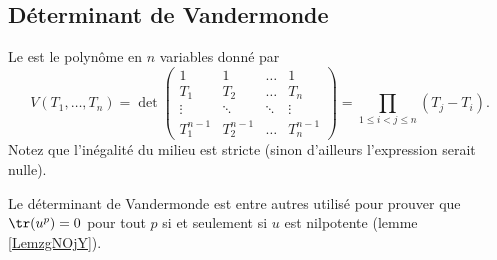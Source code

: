 \subsection{Déterminant de Vandermonde}

\begin{proposition}  \label{PropnuUvtj}
    Le  est le polynôme en \( n\) variables donné par
    \begin{equation}
        V(T_1,\ldots, T_n)=\det\begin{pmatrix}
             1   &   1    &   \ldots    &   1    \\
             T_1   &   T_2    &   \ldots    &   T_n    \\
             \vdots   &   \ddots    &   \ddots    &   \vdots    \\ 
             T_1^{n-1}   &   T_2^{n-1}    &   \ldots    &   T_n^{n-1}     
         \end{pmatrix}=\prod_{1\leq i<j\leq n}(T_j-T_i).
    \end{equation}
    Notez que l'inégalité du milieu est stricte (sinon d'ailleurs l'expression serait nulle).
\end{proposition}
Le déterminant de Vandermonde est entre autres utilisé pour prouver que \( \tr(u^p)=0\) pour tout \( p\) si et seulement si \( u\) est nilpotente (lemme \ref{LemzgNOjY}).

